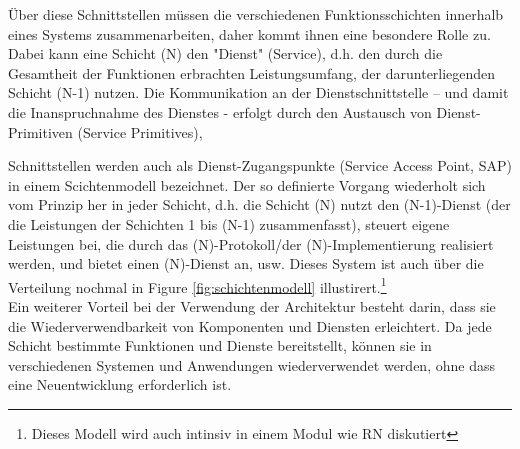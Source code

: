 \documentclass[../vs-script-first-v01.tex]{subfiles}
\begin{document}
Über diese Schnittstellen müssen  die verschiedenen Funktionsschichten innerhalb eines Systems zusammenarbeiten, daher kommt ihnen eine besondere Rolle zu. Dabei kann eine Schicht (N) den "Dienst" (Service), d.h. den durch die Gesamtheit der Funktionen erbrachten Leistungsumfang, der darunterliegenden Schicht (N-1) nutzen.
Die Kommunikation an der Dienstschnittstelle – und damit die Inanspruchnahme des Dienstes - erfolgt durch den Austausch von Dienst-Primitiven (Service Primitives),

Schnittstellen werden auch als Dienst-Zugangspunkte (Service Access Point, SAP) in einem Scichtenmodell bezeichnet.
Der so definierte Vorgang wiederholt sich vom Prinzip her in jeder Schicht, d.h. die Schicht (N) nutzt den (N-1)-Dienst (der die Leistungen der Schichten 1 bis (N-1) zusammenfasst), steuert eigene Leistungen bei, die durch das (N)-Protokoll/der (N)-Implementierung realisiert werden, und bietet einen (N)-Dienst an, usw. Dieses System ist auch über die Verteilung nochmal in Figure \ref{fig:schichtenmodell} illustirert.\footnote{Dieses Modell wird auch intinsiv in einem Modul wie RN diskutiert}
\\
\newline Ein weiterer Vorteil bei der Verwendung der Architektur besteht darin, dass sie die Wiederverwendbarkeit von Komponenten und Diensten erleichtert. Da jede Schicht bestimmte Funktionen und Dienste bereitstellt, können sie in verschiedenen Systemen und Anwendungen wiederverwendet werden, ohne dass eine Neuentwicklung erforderlich ist. 
\end{document}
